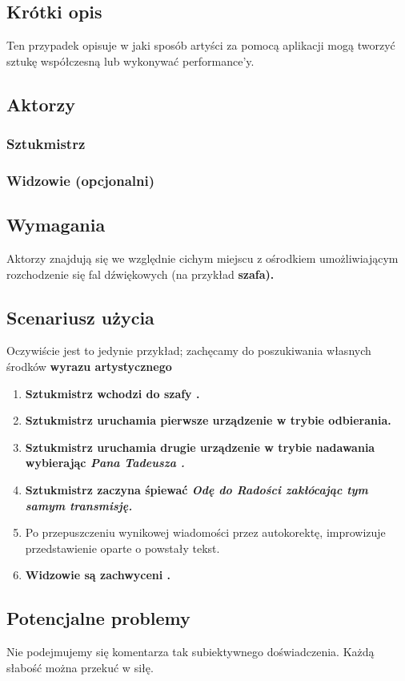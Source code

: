 \documentclass{article}
\begin{document}
\subsection{Krótki opis}
Ten przypadek opisuje w jaki sposób artyści za pomocą aplikacji mogą tworzyć sztukę współczesną lub wykonywać performance'y.
\subsection{Aktorzy}
\subsubsection{Sztukmistrz}
\subsubsection{Widzowie (opcjonalni)}
\subsection{Wymagania}
Aktorzy znajdują się we względnie cichym miejscu z ośrodkiem umożliwiającym rozchodzenie się fal dźwiękowych (na przykład \bf{szafa}).

\subsection{Scenariusz użycia}
\normalfont
Oczywiście jest to jedynie przykład; zachęcamy do poszukiwania własnych środków \bf wyrazu artystycznego
\begin{enumerate}
	\normalfont \item \bf Sztukmistrz \normalfont wchodzi do \bf szafy \normalfont.
	\item \bf Sztukmistrz \normalfont uruchamia pierwsze urządzenie w trybie odbierania.
	\item \bf Sztukmistrz \normalfont uruchamia drugie urządzenie w trybie nadawania wybierając \it Pana Tadeusza \normalfont.
	\item \bf Sztukmistrz \normalfont zaczyna śpiewać \it Odę do Radości \normalfont zakłócając tym samym transmisję.
	\item Po przepuszczeniu wynikowej wiadomości przez autokorektę, improwizuje przedstawienie oparte o powstały tekst.
	\item \bf Widzowie \normalfont są \bf zachwyceni \normalfont.
\end{enumerate}

\subsection{Potencjalne problemy}
\normalfont
Nie podejmujemy się komentarza tak subiektywnego doświadczenia. Każdą słabość można przekuć w siłę.
\end{document}
